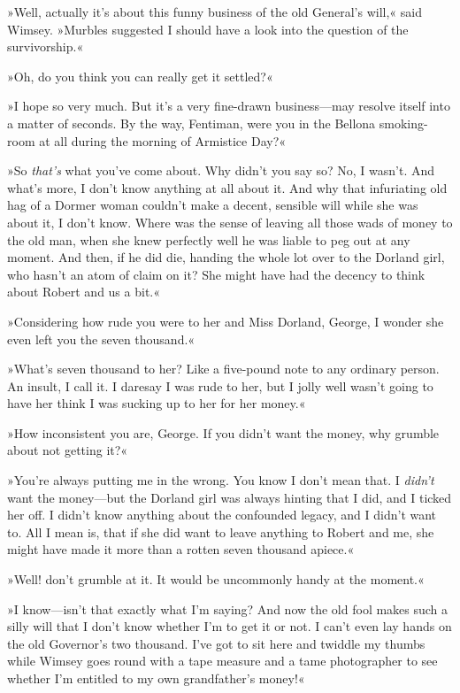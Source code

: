 »Well, actually it's about this funny business of the old General's will,« said Wimsey. »Murbles suggested I should have a look into the question of the survivorship.«

»Oh, do you think you can really get it settled?«

»I hope so very much. But it's a very fine-drawn business\allowbreak---\allowbreak may resolve itself into a matter of seconds. By the way, Fentiman, were you in the Bellona smoking-room at all during the morning of Armistice Day?«

»So \textit{that's} what you've come about. Why didn't you say so? No, I wasn't. And what's more, I don't know anything at all about it. And why that infuriating old hag of a Dormer woman couldn't make a decent, sensible will while she was about it, I don't know. Where was the sense of leaving all those wads of money to the old man, when she knew perfectly well he was liable to peg out at any moment. And then, if he did die, handing the whole lot over to the Dorland girl, who hasn't an atom of claim on it? She might have had the decency to think about Robert and us a bit.«

»Considering how rude you were to her and Miss Dorland, George, I wonder she even left you the seven thousand.«

»What's seven thousand to her? Like a five-pound note to any ordinary person. An insult, I call it. I daresay I was rude to her, but I jolly well wasn't going to have her think I was sucking up to her for her money.«

»How inconsistent you are, George. If you didn't want the money, why grumble about not getting it?«

»You're always putting me in the wrong. You know I don't mean that. I \textit{didn't} want the money\allowbreak---\allowbreak but the Dorland girl was always hinting that I did, and I ticked her off. I didn't know anything about the confounded legacy, and I didn't want to. All I mean is, that if she did want to leave anything to Robert and me, she might have made it more than a rotten seven thousand apiece.«

»Well! don't grumble at it. It would be uncommonly handy at the moment.«

»I know\allowbreak---\allowbreak isn't that exactly what I'm saying? And now the old fool makes such a silly will that I don't know whether I'm to get it or not. I can't even lay hands on the old Governor's two thousand. I've got to sit here and twiddle my thumbs while Wimsey goes round with a tape measure and a tame photographer to see whether I'm entitled to my own grandfather's money!«

